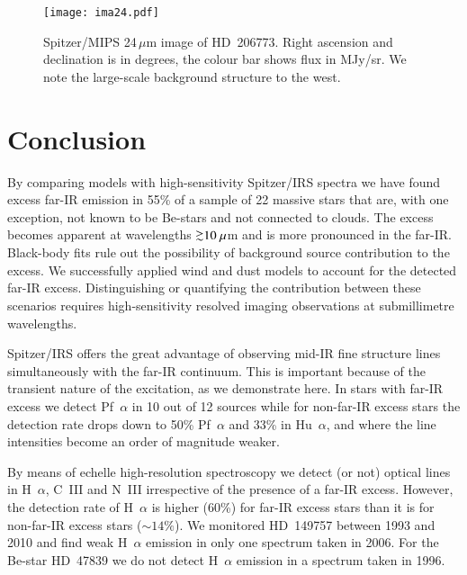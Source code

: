 \documentclass[tradiabstract]{aa} %
\newcommand{\simgreat} {\mathbin{\lower 3pt\hbox{$\rlap{\raise
        5pt\hbox{$\char'076$}}\mathchar"7218$}}}
\begin{document}
\begin{figure} [h!tb]
\texttt{[image: ima24.pdf]}
\caption{Spitzer/MIPS 24\,$\mu$m image of HD~206773. Right ascension and
  declination is in degrees, the colour bar shows flux in MJy/sr. We note
  the large-scale background structure to the west. \label{ima24.fig}}
\end{figure}


\section{Conclusion}

By comparing models with high-sensitivity Spitzer/IRS spectra we have
found excess far-IR emission in 55\% of a sample of 22 massive stars
that are, with one exception, not known to be Be-stars and not connected
to clouds. The excess becomes apparent at wavelengths $\simgreat 10
\ \mu$m and is more pronounced in the far-IR. Black-body fits rule out
the possibility of background source contribution to the excess.  We
successfully applied wind and dust models to account for the detected
far-IR excess. Distinguishing or quantifying the contribution between
these scenarios requires high-sensitivity resolved imaging
observations at submillimetre wavelengths.

Spitzer/IRS offers the great advantage of observing mid-IR 
fine structure lines simultaneously with the far-IR continuum. This is
important because of the transient nature of the
excitation, as we demonstrate here. In stars with far-IR excess we detect Pf~$\alpha$ in 10
out of 12 sources while for  { non-}far-IR excess stars the detection rate
drops down to 50\% Pf~$\alpha$ and 33\% in Hu~$\alpha$, and where the
line intensities become an order of magnitude weaker.


By means of { echelle} high-resolution spectroscopy we detect (or
not) optical lines in H~$\alpha$, C~III and N~III
irrespective of the presence of a far-IR excess. However, the
detection rate of H~$\alpha$ is higher (60\%) for far-IR excess stars
than it is for{ non-}far-IR excess stars ($\sim 14\%$). We monitored
HD~149757 between 1993 and 2010 and find weak H~$\alpha$ emission in only one spectrum taken in
2006. For the Be-star HD~47839 we do not
detect H~$\alpha$ emission in a spectrum taken in 1996.  
\end{document}
